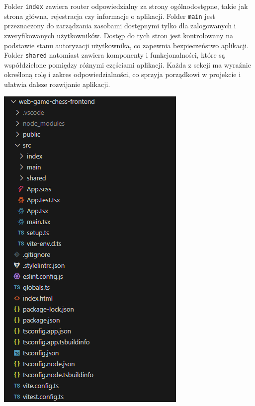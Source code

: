 \documentclass[twoside]{projektInzynierskiMS1}
\begin{document}
\vspace{0.5cm}
\noindent
\begin{minipage}[t]{0.45\textwidth} 
    \vspace{0pt} 
    \justifying 
    \noindent 
    Folder \texttt{index} zawiera router odpowiedzialny za strony ogólnodostępne, takie jak strona główna, rejestracja czy informacje o aplikacji. Folder \texttt{main} jest przeznaczony do zarządzania zasobami dostępnymi tylko dla zalogowanych i zweryfikowanych użytkowników. Dostęp do tych stron jest kontrolowany na podstawie stanu autoryzacji użytkownika, co zapewnia bezpieczeństwo aplikacji. Folder \texttt{shared} natomiast zawiera komponenty i funkcjonalności, które są współdzielone pomiędzy różnymi częściami aplikacji. Każda z sekcji ma wyraźnie określoną rolę i zakres odpowiedzialności, co sprzyja porządkowi w projekcie i ułatwia dalsze rozwijanie aplikacji.
\end{minipage} 
\hfill 
\begin{minipage}[t]{0.45\textwidth} 
    \vspace{0pt} 
    \centering 
    \includegraphics[width=\linewidth]{images/struktura_front.png}
\end{minipage}
\end{document}
